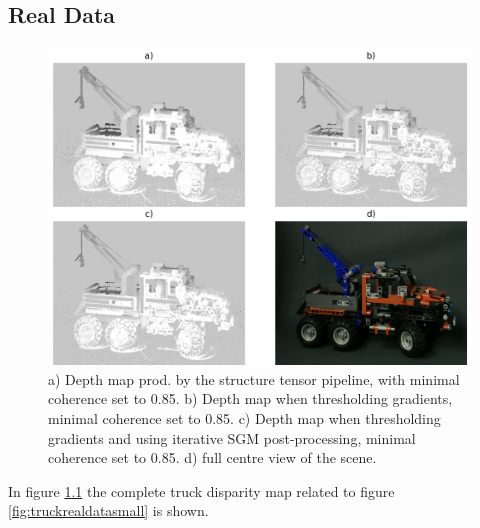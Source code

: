 \documentclass  [
  paper    = a4,
  BCOR     = 10mm,
  twoside,
  fontsize = 12pt,
  fleqn,
  toc      = bibnumbered,
  toc      = listofnumbered,
  numbers  = noendperiod,
  headings = normal,
  listof   = leveldown,
  version  = 3.03
]                                       {scrreprt}
\begin{document}
\begin{appendix}
\chapter{Real Data}
\label{sec:realdata_appendix}
\begin{figure}[h!]
	\centering
	\includegraphics[width=1\linewidth]{images/truck_realdata.png}
	\caption[Truck with iterative SGM]{a) Depth map prod. by the structure tensor pipeline, with minimal coherence set to 0.85. b) Depth map when thresholding gradients, minimal coherence set to 0.85. c) Depth map when thresholding gradients and using iterative SGM post-processing, minimal coherence set to 0.85.  d) full centre view of the scene.}
	\label{fig:truckrealdata}
\end{figure}
In figure \ref{fig:truckrealdata} the complete truck disparity map related to figure \ref{fig:truckrealdatasmall} is shown.

\end{appendix}
\end{document}
